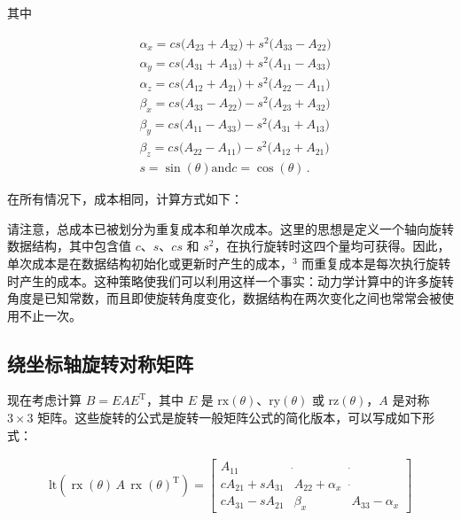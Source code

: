 \documentclass[10pt,a4paper]{book}
\theoremstyle{thmstyle} %
\theoremstyle{defstyle} %
\theoremstyle{prostyle} %
\begin{document}
其中



$$
\begin{array}{rl} & { \alpha _ { x } = c s \big ( A _ { 23 } + A _ { 32 } \big ) + s ^{2} \big ( A _ { 33 } - A _ { 22 } \big ) } \\& { \alpha _ { y } = c s \big ( A _ { 31 } + A _ { 13 } \big ) + s ^{2} \big ( A _ { 11 } - A _ { 33 } \big ) } \\& { \alpha _ { z } = c s \big ( A _ { 12 } + A _ { 21 } \big ) + s ^{2} \big ( A _ { 22 } - A _ { 11 } \big ) } \\& { \beta _ { x } = c s \big ( A _ { 33 } - A _ { 22 } \big ) - s ^{2} \big ( A _ { 23 } + A _ { 32 } \big ) } \\& { \beta _ { y } = c s \big ( A _ { 11 } - A _ { 33 } \big ) - s ^{2} \big ( A _ { 31 } + A _ { 13 } \big ) } \\& { \beta _ { z } = c s \big ( A _ { 22 } - A _ { 11 } \big ) - s ^{2} \big ( A _ { 12 } + A _ { 21 } \big ) } \\& {     s = \sin ( \theta )  \mathrm { a n d }  c = \cos ( \theta ) \, . } \end{array}
$$



在所有情况下，成本相同，计算方式如下：





请注意，总成本已被划分为重复成本和单次成本。这里的思想是定义一个轴向旋转数据结构，其中包含值 $c$、$s$、$cs$ 和 $s^2$，在执行旋转时这四个量均可获得。因此，单次成本是在数据结构初始化或更新时产生的成本，$^3$ 而重复成本是每次执行旋转时产生的成本。这种策略使我们可以利用这样一个事实：动力学计算中的许多旋转角度是已知常数，而且即使旋转角度变化，数据结构在两次变化之间也常常会被使用不止一次。



\subsection{绕坐标轴旋转对称矩阵}





现在考虑计算 $B = EAE^{\mathrm{T}}$，其中 $E$ 是 $\mathrm{rx}(\theta)$、$\mathrm{ry}(\theta)$ 或 $\mathrm{rz}(\theta)$，$A$ 是对称 $3 \times 3$ 矩阵。这些旋转的公式是旋转一般矩阵公式的简化版本，可以写成如下形式：



$$
\begin{array}{r} { \mathrm { l t } ( \operatorname { r x } ( \theta ) \, A \, \operatorname { r x } ( \theta ) ^{\mathrm { T} } ) = \left[ \begin{array}{lll} { A _ { 11 } } & { \dot { } } & { \dot { } } \\{ c A _ { 21 } + s A _ { 31 } } & { A _ { 22 } + \alpha _ { x } } & { \dot { } } \\{ c A _ { 31 } - s A _ { 21 } } & { \beta _ { x } } & { A _ { 33 } - \alpha _ { x } } \end{array} \right] } \end{array}
$$
\end{document}
